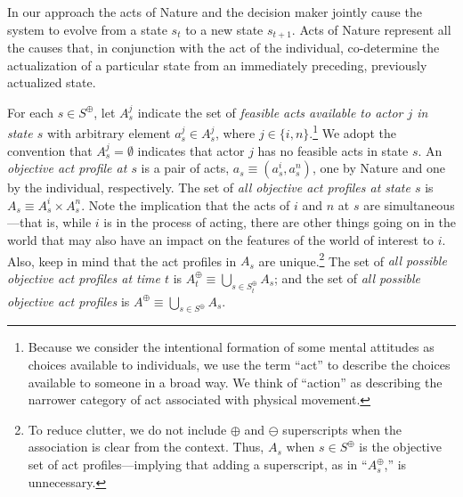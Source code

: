 \documentclass[
11pt,
titlepage,
reqno,
]{article}%
\theoremstyle{definition}
\begin{document}
In our approach the acts of Nature and the decision maker jointly cause the system to evolve from a state $s_t$ to a new state $s_{t+1}$.
Acts of Nature represent all the causes that, in conjunction with the act of the individual, co-determine the actualization of a particular state from an immediately preceding, previously actualized state.
	
For each  $s\in S^\oplus$, let $A^j_s$ indicate the set of \textit{feasible acts available to actor $j$ in state $s$} with arbitrary element $a^j_s\in A^j_s$, where $j\in\{i,n\}$.\footnote
{
	Because we consider the intentional formation of some mental attitudes as choices available to individuals, we use the term ``act'' to describe the choices available to someone in a broad way.
	We think of ``action'' as describing the narrower category of act associated with physical movement.
} 
We adopt the convention that $A^j_s=\emptyset$ indicates that actor $j$ has no feasible acts in state $s$.
An \textit{objective act profile at $s$}  is a pair of acts, $a_s\equiv(a^i_s,a^n_s)$, one by Nature and one by the individual, respectively. 
The set of \textit{all objective act profiles at state $s$} is $A_s\equiv A^i_s\times A^n_s$.
Note the implication that the acts of $i$ and $n$ at $s$ are simultaneous---that is, while $i$ is in the process of acting, there are other things going on in the world that may also have an impact on the features of the world of interest to $i$.
Also, keep in mind that the act profiles in $A_s$ are unique.\footnote
{
	To reduce clutter, we do not include $\oplus$ and $\ominus$ superscripts when the association is clear from the context. Thus, $A_s$ when $s\in S^\oplus$ is the objective set of act profiles---implying that adding a superscript, as in ``$A^\oplus_s$,'' is unnecessary.
} 
The set of \textit{all possible objective act profiles at time $t$} is  $A^\oplus_t\equiv \bigcup_{s\in S^\oplus_t} A_s$; and the set of \textit{all possible objective act profiles} is $A^\oplus\equiv \bigcup_{s\in S^\oplus} A_s$.
 
\end{document}
